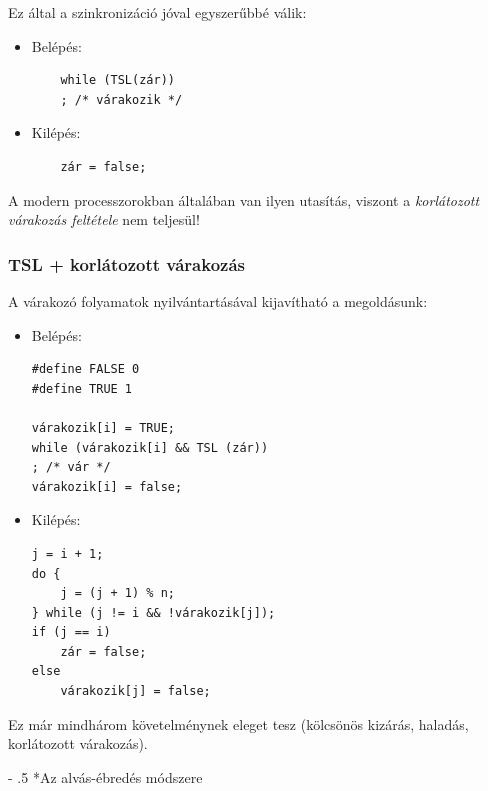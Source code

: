 \documentclass[tikz,12pt,margin=0px]{article}
\makeatletter
\renewcommand\paragraph{%
	\@startsection{paragraph}{4}{0mm}%
	{-\baselineskip}%
	{.5\baselineskip}%
	{\normalfont\normalsize\bfseries}}
\makeatother
\begin{document}
    \noindent Ez által a szinkronizáció jóval egyszerűbbé válik:
    \begin{itemize}
        \item Belépés:
        \begin{verbatim}
    while (TSL(zár))
    ; /* várakozik */
        \end{verbatim}
        \item Kilépés:
        \begin{verbatim}
    zár = false;
        \end{verbatim}
    \end{itemize}

    \noindent A modern processzorokban általában van ilyen utasítás, viszont a \emph{korlátozott várakozás feltétele} nem teljesül!

    \subsubsection*{TSL + korlátozott várakozás}

    A várakozó folyamatok nyilvántartásával kijavítható a megoldásunk:

    \begin{itemize}
        \item Belépés:
        \begin{verbatim}
#define FALSE 0
#define TRUE 1

várakozik[i] = TRUE;
while (várakozik[i] && TSL (zár))
; /* vár */
várakozik[i] = false;
        \end{verbatim}
        \item Kilépés:
        \begin{verbatim}
j = i + 1;
do {
    j = (j + 1) % n;
} while (j != i && !várakozik[j]);
if (j == i)
    zár = false;
else
    várakozik[j] = false;
        \end{verbatim}
    \end{itemize}

    \noindent Ez már mindhárom követelménynek eleget tesz (kölcsönös kizárás, haladás, korlátozott várakozás).

    \paragraph*{Az alvás-ébredés módszere}
\end{document}
